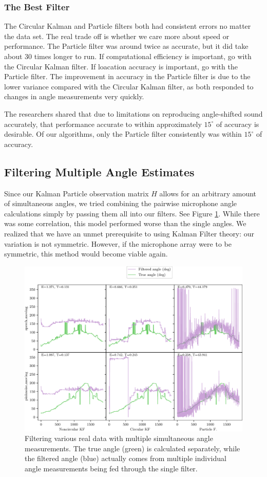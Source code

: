 \documentclass[11pt]{amsart}
\begin{document}
\subsubsection{The Best Filter}
The Circular Kalman and Particle filters both had consistent errors no matter the data set. The real trade off is whether we care more about speed or performance. The Particle filter was around twice as accurate, but it did take about 30 times longer to run. If computational efficiency is important, go with the Circular Kalman filter. If loacation accuracy is important, go with the Particle filter. The improvement in accuracy in the Particle filter is due to the lower variance compared with the Circular Kalman filter, as both responded to changes in angle measurements very quickly.

The researchers shared that due to limitations on reproducing angle-shifted sound accurately, that performance accurate to within approximately $15^{\circ}$ of accuracy is desirable. Of our algorithms, only the Particle filter consistently was within $15^{\circ}$ of accuracy.



\subsection{Filtering Multiple Angle Estimates}

Since our Kalman Particle observation matrix $H$ allows for an arbitrary amount of 
simultaneous angles, we tried combining the pairwise microphone angle 
calculations simply by passing them all into our filters. 
See Figure \ref{fig:multiple_angles}. 
While there was some correlation, this model performed worse than the single angles.
 We realized that we have an unmet prerequisite to using Kalman Filter theory: our
variation is not symmetric. However, 
if the microphone array were to be symmetric, this method would become viable again.

\begin{figure}[htp]
    \centering
    \includegraphics[width=.75\textwidth]{actual_paper_graphs/multiple_angles.pdf}\hfill
    \caption{Filtering various real data with multiple simultaneous angle measurements. The true angle (green) is calculated separately, while the filtered angle (blue) actually comes from multiple individual angle measurements being fed through the single filter.}
    \label{fig:multiple_angles}
\end{figure}
\end{document}
